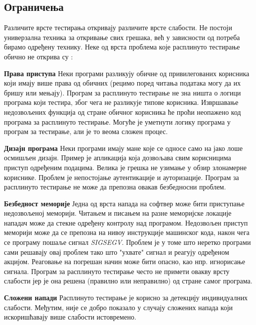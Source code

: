 \documentclass[12pt,oneside]{memoir}
\begin{document}
\subsection{Ограничења}
\label{subsec:ogranicenja}

Различите врсте тестирања откривају различите врсте слабости. Не постоји универзална техника за откривање свих грешака, већ у зависности од потреба бирамо одређену технику. Неке од врста проблема које расплинуто тестирање обично не открива су \cite{fuzzingBrute}:
\begin{description}
\item \textbf{Права приступа} Неки програми разликују обичне од привилегованих корисника који имају више права од обичних (рецимо поред читања података могу да их бришу или мењају). Програм за расплинуто тестирање не зна ништа о логици програма који тестира, због чега не разликује типове корисника. Извршавање недозвољених функција од стране обичног корисника ће проћи неопажено код програма за расплинуто тестирање. Могуће је уметнути логику програма у програм за тестирање, али је то веома сложен процес.  
\item \textbf{Дизајн програма} Неки програми имају мане које се односе само на јако лоше осмишљен дизајн. Пример је апликација која дозвољава свим корисницима приступ одређеним подацима. Велика је грешка не узимање у обзир злонамерне кориснике. Проблем је непостојање аутентикације и ауторизације. Програм за расплинуто тестирање не може да препозна овакав безбедносни проблем.
\item \textbf{Безбедност меморије} Једна од врста напада на софтвер може бити приступање недозвољеној меморији. Читањем и писањем на разне меморијске локације нападач може да стекне одређену контролу над програмом. Недозвољен приступ меморији може да се препозна на нивоу инструкције машинског кода, након чега се програму пошаље сигнал \textit{SIGSEGV}. Проблем је у томе што неретко програми сами решавају овај проблем тако што "ухвате" сигнал и реагују одређеном акцијом. Реаговање на погрешан начин може бити опасно, као нпр. игнорисање сигнала. Програм за расплинуто тестирање често не примети овакву врсту слабости јер је она решена (правилно или неправилно) од стране самог програма.
\item \textbf{Сложени напади} Расплинуто тестирање је корисно за детекцију индивидуалних слабости. Међутим, није се добро показало у случају сложених напада који искоришћавају више слабости истовремено.
\end{description}
\end{document}
